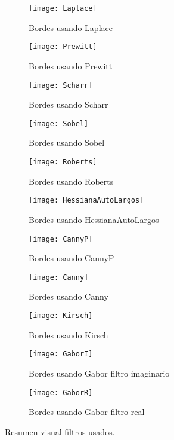 \begin{figure}
	\begin{subfigure}[c]{.33\linewidth}
	\centering\large \texttt{[image: Laplace]}
	\caption{Bordes usando Laplace}\label{fig:1.1.1}
	\end{subfigure}%
	\begin{subfigure}[c]{.33\linewidth}
	\centering\large \texttt{[image: Prewitt]}
	\caption{Bordes usando Prewitt}\label{fig:1.1.2}
	\end{subfigure}%
	\begin{subfigure}[c]{.33\linewidth}
	\centering\large \texttt{[image: Scharr]}
	\caption{Bordes usando Scharr}\label{fig:1.1.3}
	\end{subfigure}%
		
	\begin{subfigure}[c]{.33\linewidth}
	\centering\large \texttt{[image: Sobel]}
	\caption{Bordes usando Sobel}\label{fig:1.1.4}
	\end{subfigure}%
	\begin{subfigure}[c]{.33\linewidth}
	\centering\large \texttt{[image: Roberts]}
	\caption{Bordes usando Roberts}\label{fig:1.1.5}
	\end{subfigure}%
	\begin{subfigure}[c]{.33\linewidth}
	\centering\large \texttt{[image: HessianaAutoLargos]}
	\caption{Bordes usando HessianaAutoLargos}\label{fig:1.1.6}
	\end{subfigure}%
	
	\begin{subfigure}[c]{.33\linewidth}
	\centering\large \texttt{[image: CannyP]}
	\caption{Bordes usando CannyP}\label{fig:1.1.7}
	\end{subfigure}%
	\begin{subfigure}[c]{.33\linewidth}
	\centering\large \texttt{[image: Canny]}
	\caption{Bordes usando Canny}\label{fig:1.1.8}
	\end{subfigure}%
	\begin{subfigure}[c]{.33\linewidth}
	\centering\large \texttt{[image: Kirsch]}
	\caption{Bordes usando Kirsch}\label{fig:1.1.9}
	\end{subfigure}	
	
	\begin{subfigure}[c]{.33\linewidth}
	\centering\large \texttt{[image: GaborI]}
	\caption{Bordes usando Gabor filtro imaginario}\label{fig:1.1.10}
	\end{subfigure}%
	\begin{subfigure}[c]{.33\linewidth}
	\centering\large \texttt{[image: GaborR]}
	\caption{Bordes usando Gabor filtro real}\label{fig:1.1.11}
	\end{subfigure}

\caption{Resumen visual filtros usados.}\label{fig:1.1}
\end{figure}






